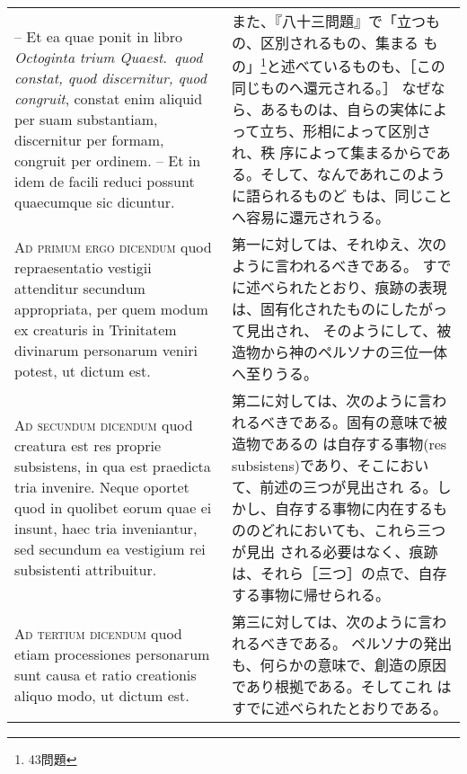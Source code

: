 \documentclass[10pt]{jsarticle} %
\begin{document}
\begin{longtable}{p{21em}p{21em}}
\\



-- Et ea quae ponit in libro {\itshape Octoginta trium
 Quaest}.~{\itshape quod constat, quod discernitur, quod congruit},
 constat enim aliquid per suam substantiam, discernitur per formam,
 congruit per ordinem. -- Et in idem de facili reduci possunt quaecumque
 sic dicuntur.


&

また、『八十三問題』で「立つもの、区別されるもの、集まる
 もの」\footnote{43問題}と述べているものも、［この同じものへ還元される。］
 なぜなら、あるものは、自らの実体によって立ち、形相によって区別され、秩
 序によって集まるからである。そして、なんであれこのように語られるものど
 もは、同じことへ容易に還元されうる。

\\


{\scshape Ad primum ergo dicendum} quod repraesentatio
 vestigii attenditur secundum appropriata, per quem modum ex creaturis
 in Trinitatem divinarum personarum veniri potest, ut dictum est.


&

第一に対しては、それゆえ、次のように言われるべきである。
すでに述べられたとおり、痕跡の表現は、固有化されたものにしたがって見出され、
 そのようにして、被造物から神のペルソナの三位一体へ至りうる。

\\


{\scshape Ad secundum dicendum} quod creatura est res
 proprie subsistens, in qua est praedicta tria invenire. Neque oportet
 quod in quolibet eorum quae ei insunt, haec tria inveniantur, sed
 secundum ea vestigium rei subsistenti attribuitur.


&

第二に対しては、次のように言われるべきである。固有の意味で被造物であるの
は自存する事物(res subsistens)であり、そこにおいて、前述の三つが見出され
る。しかし、自存する事物に内在するもののどれにおいても、これら三つが見出
される必要はなく、痕跡は、それら［三つ］の点で、自存する事物に帰せられる。

\\


{\scshape Ad tertium dicendum} quod etiam processiones
 personarum sunt causa et ratio creationis aliquo modo, ut dictum est.


&

第三に対しては、次のように言われるべきである。
ペルソナの発出も、何らかの意味で、創造の原因であり根拠である。そしてこれ
 はすでに述べられたとおりである。


\end{longtable}
\newpage
{}
\end{document}
